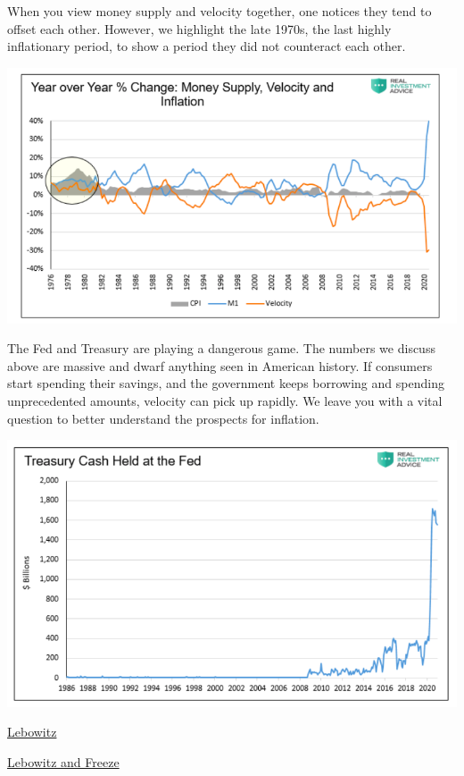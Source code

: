 \documentclass[
]{book}
\begin{document}
When you view money supply and velocity together, one notices they tend to offset each other. However, we highlight the late 1970s, the last highly inflationary period, to show a period they did not counteract each other.

\includegraphics{fig/money_and_inflation_US.png}

The Fed and Treasury are playing a dangerous game. The numbers we discuss above are massive and dwarf anything seen in American history. If consumers start spending their savings, and the government keeps borrowing and spending unprecedented amounts, velocity can pick up rapidly. We leave you with a vital question to better understand the prospects for inflation.

\includegraphics{fig/Treasury_cash_at_FED.png}

\href{https://www.seeitmarket.com/is-inflation-coming-in-2021-watch-money-supply-and-velocity/}{Lebowitz}

\href{https://realinvestmentadvice.com/stoking-the-embers-of-inflation/}{Lebowitz and Freeze}
\end{document}
